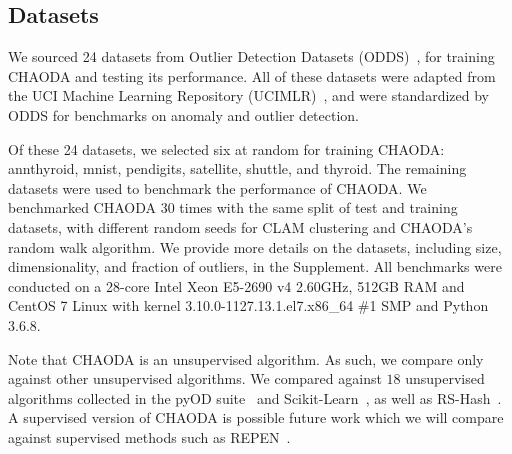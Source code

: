 \subsection{Datasets}
\label{subsec:methods:datasets}

We sourced 24 datasets from Outlier Detection Datasets (ODDS)~\cite{rayana2016odds}, for training CHAODA and testing its performance.
All of these datasets were adapted from the UCI Machine Learning Repository (UCIMLR)~\cite{UCIMLR}, and were standardized by ODDS for benchmarks on anomaly and outlier detection.

Of these 24 datasets, we selected six at random for training CHAODA: annthyroid, mnist, pendigits, satellite, shuttle, and thyroid.
The remaining datasets were used to benchmark the performance of CHAODA\@.
We benchmarked CHAODA 30 times with the same split of test and training datasets, with different random seeds for CLAM clustering and CHAODA's random walk algorithm.
We provide more details on the datasets, including size, dimensionality, and fraction of outliers, in the Supplement.
All benchmarks were conducted on a 28-core Intel Xeon E5-2690 v4 2.60GHz, 512GB RAM and CentOS 7 Linux with kernel 3.10.0-1127.13.1.el7.x86\_64 \#1 SMP and Python 3.6.8.

Note that CHAODA is an unsupervised algorithm.
As such, we compare only against other unsupervised algorithms.
We compared against $18$ unsupervised algorithms collected in the pyOD suite~\cite{zhao2019pyod} and Scikit-Learn~\cite{pedregosa2011scikit}, as well as RS-Hash~\cite{sathe2016subspace}.
A supervised version of CHAODA is possible future work which we will compare against supervised methods such as REPEN~\cite{pang2018learning}.